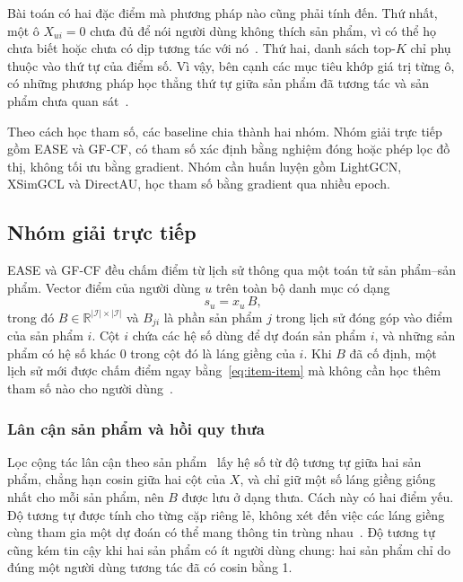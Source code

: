 Bài toán có hai đặc điểm mà phương pháp nào cũng phải tính đến. Thứ nhất, một ô $X_{ui}=0$ chưa đủ để nói người dùng không thích sản phẩm, vì có thể họ chưa biết hoặc chưa có dịp tương tác với nó~\cite{hu2008wmf}. Thứ hai, danh sách top-$K$ chỉ phụ thuộc vào thứ tự của điểm số. Vì vậy, bên cạnh các mục tiêu khớp giá trị từng ô, có những phương pháp học thẳng thứ tự giữa sản phẩm đã tương tác và sản phẩm chưa quan sát~\cite{rendle2009bpr}.

Theo cách học tham số, các baseline chia thành hai nhóm. Nhóm giải trực tiếp gồm EASE và GF-CF, có tham số xác định bằng nghiệm đóng hoặc phép lọc đồ thị, không tối ưu bằng gradient. Nhóm cần huấn luyện gồm LightGCN, XSimGCL và DirectAU, học tham số bằng gradient qua nhiều epoch.

\subsection{Nhóm giải trực tiếp}
\label{sec:closed-form-models}

EASE và GF-CF đều chấm điểm từ lịch sử thông qua một toán tử sản phẩm--sản phẩm. Vector điểm của người dùng $u$ trên toàn bộ danh mục có dạng
\begin{equation}
s_u=x_u\,B ,
\label{eq:item-item}
\end{equation}
trong đó $B\in\mathbb{R}^{|\mathcal{I}|\times|\mathcal{I}|}$ và $B_{ji}$ là phần sản phẩm $j$ trong lịch sử đóng góp vào điểm của sản phẩm $i$. Cột $i$ chứa các hệ số dùng để dự đoán sản phẩm $i$, và những sản phẩm có hệ số khác 0 trong cột đó là láng giềng của $i$. Khi $B$ đã cố định, một lịch sử mới được chấm điểm ngay bằng~\eqref{eq:item-item} mà không cần học thêm tham số nào cho người dùng~\cite{steck2019ease,shen2021gfcf}.

\subsubsection{Lân cận sản phẩm và hồi quy thưa}
\label{sec:item-neighborhood}

Lọc cộng tác lân cận theo sản phẩm~\cite{sarwar2001itembased} lấy hệ số từ độ tương tự giữa hai sản phẩm, chẳng hạn cosin giữa hai cột của $X$, và chỉ giữ một số láng giềng giống nhất cho mỗi sản phẩm, nên $B$ được lưu ở dạng thưa. Cách này có hai điểm yếu. Độ tương tự được tính cho từng cặp riêng lẻ, không xét đến việc các láng giềng cùng tham gia một dự đoán có thể mang thông tin trùng nhau~\cite{koren2008factorization}. Độ tương tự cũng kém tin cậy khi hai sản phẩm có ít người dùng chung: hai sản phẩm chỉ do đúng một người dùng tương tác đã có cosin bằng 1.

